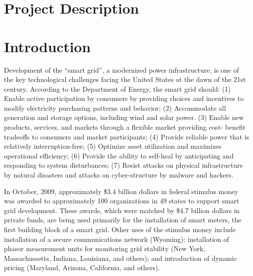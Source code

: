 
\renewcommand{\thepage} {C--\arabic{page}}

\renewcommand{\thesection} {C.\arabic{section}}
\setcounter{section}{0}

\section{Project Description}

\section{Introduction}

Development of the ``smart grid'', a modernized power infrastructure, is
one of the key technological challenges facing the United States at the
dawn of the 21st century. According to the Department of Energy, the smart
grid should: (1) Enable active participation by consumers by providing
choices and incentives to modify electricity purchasing patterns and
behavior; (2) Accommodate all generation and storage options, including
wind and solar power.  (3) Enable new products, services, and markets
through a flexible market providing cost- benefit tradeoffs to consumers
and market participants; (4) Provide reliable power that is relatively
interruption-free; (5) Optimize asset utilization and maximizes operational
efficiency; (6) Provide the ability to self-heal by anticipating and
responding to system disturbances; (7) Resist attacks on physical
infrastructure by natural disasters and attacks on cyber-structure by
malware and hackers.

In October, 2009, approximately \$3.4 billion dollars in federal stimulus
money was awarded to approximately 100 organizations in 49 states to
support smart grid development.  These awards, which were matched by \$4.7
billion dollars in private funds, are being used primarily for the
installation of smart meters, the first building block of a smart grid.
Other uses of the stimulus money include installation of a secure
communications network (Wyoming); installation of phasor measurement units
for monitoring grid stability (New York, Massachussetts, Indiana,
Louisiana, and others); and introduction of dynamic pricing (Maryland,
Arizona, California, and others).

